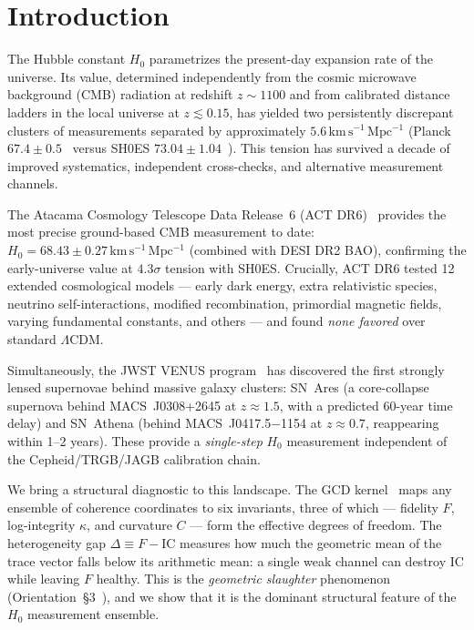 \documentclass[
  aps,
  prd,
  twocolumn,
  superscriptaddress,
  nofootinbib,
  floatfix
]{revtex4-2}
\newcommand{\IC}{\mathrm{IC}}
\newcommand{\hetgap}{\Delta}
\newcommand{\Fid}{F}
\newcommand{\Curv}{C}
\newcommand{\Logint}{\kappa}
\begin{document}
\maketitle

\section{Introduction}\label{sec:intro}

The Hubble constant $H_0$ parametrizes the present-day expansion
rate of the universe.
Its value, determined independently from the cosmic microwave
background (CMB) radiation at redshift $z \sim 1100$ and from
calibrated distance ladders in the local universe at
$z \lesssim 0.15$, has yielded two persistently discrepant
clusters of measurements separated by approximately
$5.6\,\mathrm{km\,s^{-1}\,Mpc^{-1}}$
(Planck $67.4 \pm 0.5$~\cite{planck2018vi} versus SH0ES
$73.04 \pm 1.04$~\cite{riess2022shoes}).
This tension has survived a decade of improved systematics,
independent cross-checks, and alternative measurement channels.

The Atacama Cosmology Telescope Data Release~6
(ACT DR6)~\cite{naess2025act_maps,louis2025act_dr6,calabrese2025act_ext}
provides the most precise ground-based CMB measurement to date:
$H_0 = 68.43 \pm 0.27\,\mathrm{km\,s^{-1}\,Mpc^{-1}}$ (combined
with DESI DR2 BAO), confirming the early-universe value at
$4.3\sigma$ tension with SH0ES.
Crucially, ACT DR6 tested 12 extended cosmological models
--- early dark energy, extra relativistic species, neutrino
self-interactions, modified recombination, primordial magnetic fields,
varying fundamental constants, and others --- and found
\emph{none favored} over standard $\Lambda$CDM.

Simultaneously, the JWST VENUS program~\cite{venus2026}
has discovered the first strongly lensed supernovae behind
massive galaxy clusters: SN~Ares (a core-collapse supernova
behind MACS~J0308+2645 at $z \approx 1.5$, with a predicted
60-year time delay) and SN~Athena (behind MACS~J0417.5$-$1154
at $z \approx 0.7$, reappearing within 1--2 years).
These provide a \emph{single-step} $H_0$ measurement independent
of the Cepheid/TRGB/JAGB calibration chain.

We bring a structural diagnostic to this landscape.
The GCD kernel~\cite{paulus2025umcp,paulus2025physicscoherence,paulus2026umcpcasepack}
maps any ensemble of coherence coordinates to six invariants,
three of which --- fidelity $\Fid$, log-integrity $\Logint$,
and curvature $\Curv$ --- form the effective degrees of freedom.
The heterogeneity gap $\hetgap \equiv \Fid - \IC$ measures how
much the geometric mean of the trace vector falls below its
arithmetic mean: a single weak channel can destroy $\IC$ while
leaving $\Fid$ healthy.
This is the \emph{geometric slaughter} phenomenon
(Orientation~\S3~\cite{paulus2025umcp}), and we show that it
is the dominant structural feature of the $H_0$ measurement
ensemble.
\end{document}
